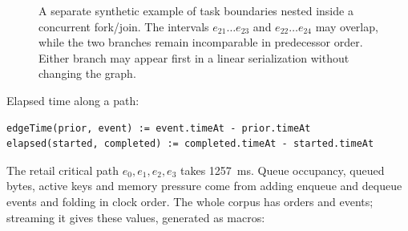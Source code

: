 \begin{figure}[htbp]
\centering
{}
\caption{A separate synthetic example of task boundaries nested inside a concurrent fork/join. The intervals
$e_{21}\ldots e_{23}$ and $e_{22}\ldots e_{24}$ may overlap, while the two
branches remain incomparable in predecessor order. Either branch may appear
first in a linear serialization without changing the graph.}
\label{fig:concurrent-task-boundaries}
\end{figure}

Elapsed time along a path:

\begin{lstlisting}
edgeTime(prior, event) := event.timeAt - prior.timeAt
elapsed(started, completed) := completed.timeAt - started.timeAt
\end{lstlisting}

The retail critical path $e_0,e_1,e_2,e_3$ takes 1257~ms. Queue occupancy, queued
bytes, active keys and memory pressure come from adding enqueue and dequeue events
and folding in clock order. The whole corpus has \BakeryOrders{} orders and
\BakeryEvents{} events; streaming it gives these values, generated as macros:

